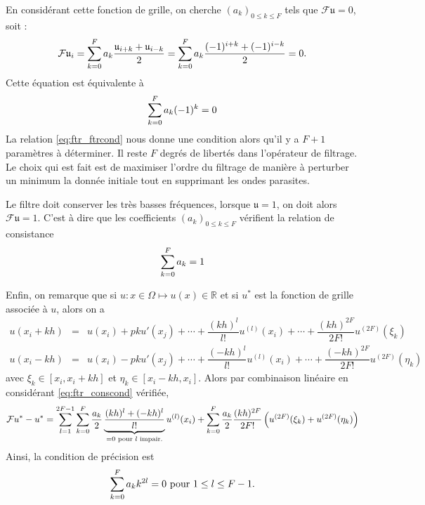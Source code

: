 En considérant cette fonction de grille, on cherche $(a_k)_{0\leq k \leq F}$ tels que $\mathcal{F} \mathfrak{u} = \mathfrak{0}$, soit :
\begin{equation}
\mathcal{F}\mathfrak{u}_i = \displaystyle\sum\limits_{k=0}^F a_k \dfrac{\mathfrak{u}_{i+k} + \mathfrak{u}_{i-k}}{2} = \displaystyle\sum\limits_{k=0}^F a_k  \dfrac{(-1)^{i+k} + (-1)^{i-k}}{2} = 0.
\end{equation}
Cette équation est équivalente à 
\begin{equation}
\displaystyle\sum\limits_{k=0}^F a_k (-1)^k = 0
\label{eq:ftr_ftrcond}
\end{equation}
La relation \eqref{eq:ftr_ftrcond} nous donne une condition alors qu'il y a $F+1$ paramètres à déterminer. Il reste $F$ degrés de libertés dans l'opérateur de filtrage. Le choix qui est fait est de maximiser l'ordre du filtrage de manière à perturber un minimum la donnée initiale tout en supprimant les ondes parasites.

Le filtre doit conserver les très basses fréquences, lorsque $\mathfrak{u} = \mathfrak{1}$, on doit alors $\mathcal{F}\mathfrak{u} = \mathfrak{1}$.
C'est à dire que les coefficients $(a_k)_{0 \leq k \leq F}$ vérifient la relation de consistance
\begin{equation}
\displaystyle\sum\limits_{k=0}^F a_k = 1
\label{eq:ftr_conscond}
\end{equation}

Enfin, on remarque que si $u : x \in \Omega \mapsto u(x) \in \mathbb{R}$ et si $u^*$ est la fonction de grille associée à $u$, alors on a 
\begin{equation}
\begin{array}{rcl}
u(x_i + kh) & = & u(x_i) + p k u'(x_j) + \cdots + \dfrac{(kh)^l}{l!}u^{(l)}(x_i) + \cdots +\dfrac{(kh)^{2F}}{2F!} u^{(2F)}(\xi_k)\\
u(x_i - kh) & = & u(x_i) - p k u'(x_j) + \cdots + \dfrac{(-kh)^l}{l!}u^{(l)}(x_i) + \cdots +\dfrac{(-kh)^{2F}}{2F!} u^{(2F)}(\eta_k)
\end{array}
\end{equation}
avec $\xi_k \in [x_i, x_i+kh]$ et $\eta_k \in [x_i-kh, x_i]$. Alors par combinaison linéaire en considérant \eqref{eq:ftr_conscond} vérifiée, 
\begin{equation}
\mathcal{F}u^* - u^* = \displaystyle\sum\limits_{l=1}^{2F-1} \displaystyle\sum\limits_{k=0}^F \dfrac{a_k}{2} \underbrace{\dfrac{(kh)^l + (-kh)^l}{l!}}_{=0 \text{ pour } l \text{ impair.}}u^{(l)}(x_i) + \displaystyle\sum\limits_{k=0}^F \dfrac{a_k}{2}\dfrac{(kh)^{2F}}{2F!} \left( u^{(2F)}(\xi_k) + u^{(2F)}(\eta_k) \right)
\end{equation}
Ainsi, la condition de précision est 
\begin{equation}
\displaystyle\sum\limits_{k=0}^F a_k k^{2l} = 0 \text{ pour } 1 \leq l \leq F-1.
\label{eq:ftr_prescond}
\end{equation}

